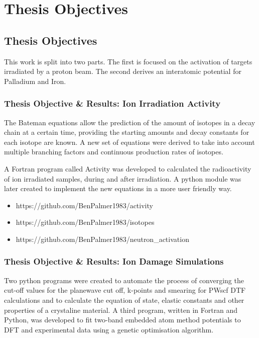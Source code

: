 \chapter{Thesis Objectives}

\begin{changemargin}{1.0cm}{1.0cm} 
\end{changemargin}
 
\section{Thesis Objectives}

This work is split into two parts.  The first is focused on the activation of targets irradiated by a proton beam.  The second derives an interatomic potential for Palladium and Iron.

\subsection{Thesis Objective & Results: Ion Irradiation Activity}

The Bateman equations allow the prediction of the amount of isotopes in a decay chain at a certain time, providing the starting amounts and decay constants for each isotope are known.  A new set of equations were derived to take into account multiple branching factors and continuous production rates of isotopes.  

A Fortran program called Activity was developed to calculated the radioactivity of ion irradiated samples, during and after irradiation.  A python module was later created to implement the new equations in a more user friendly way.

\begin{itemize}
\item https://github.com/BenPalmer1983/activity
\item https://github.com/BenPalmer1983/isotopes
\item https://github.com/BenPalmer1983/neutron\_activation
\end{itemize}



\subsection{Thesis Objective & Results: Ion Damage Simulations}

Two python programs were created to automate the process of converging the cut-off values for the planewave cut off, k-points and smearing for PWscf DTF calculations and to  calculate the equation of state, elastic constants and other properties of a crystaline material.  A third program, written in Fortran and Python, was developed to fit two-band embedded atom method potentials to DFT and experimental data using a genetic optimisation algorithm.

